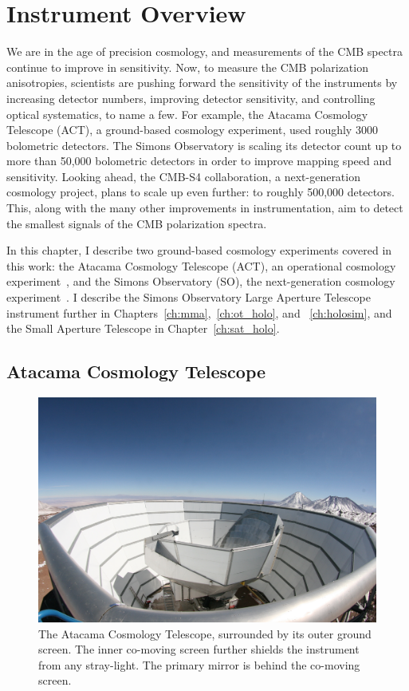 \chapter{Instrument Overview}
\label{ch:instruments}

We are in the age of precision cosmology, and measurements of the CMB spectra continue to improve in sensitivity.  Now, to measure the CMB polarization anisotropies, scientists are pushing forward the sensitivity of the instruments by increasing detector numbers, improving detector sensitivity, and controlling optical systematics, to name a few.  For example, the Atacama Cosmology Telescope (ACT), a ground-based cosmology experiment, used roughly 3000 bolometric detectors.  The Simons Observatory is scaling its detector count up to more than 50,000 bolometric detectors in order to improve mapping speed and sensitivity.  Looking ahead, the CMB-S4 collaboration, a next-generation cosmology project, plans to scale up even further: to roughly 500,000 detectors.  This, along with the many other improvements in instrumentation, aim to detect the smallest signals of the CMB polarization spectra.

In this chapter, I describe two ground-based cosmology experiments covered in this work: the Atacama Cosmology Telescope (ACT), an operational cosmology experiment~\cite{act_inst}, and the Simons Observatory (SO), the next-generation cosmology experiment~\cite{so19}.  I describe the Simons Observatory Large Aperture Telescope instrument further in Chapters~\ref{ch:mma},~\ref{ch:ot_holo}, and ~\ref{ch:holosim}, and the Small Aperture Telescope in Chapter~\ref{ch:sat_holo}.

\section{Atacama Cosmology Telescope}

\begin{figure}[t]
    \centering
    \includegraphics[width = \textwidth]{Figures/act_inst_close.jpeg}
    \caption{The Atacama Cosmology Telescope, surrounded by its outer ground screen. The inner co-moving screen further shields the instrument from any stray-light.  The primary mirror is behind the co-moving screen.}
    \label{fig:act_site}
\end{figure}


